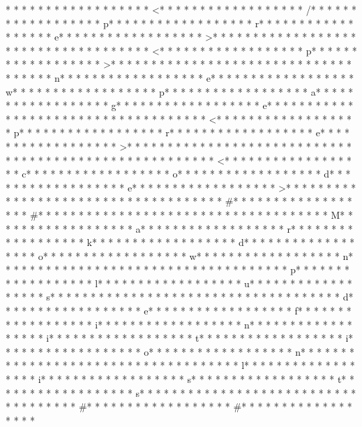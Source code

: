 * * *  * * *  * * *  *  * * *  *  * * *  * <* * *  * * *  * * *  *  * * *  *  * * *  * /* * *  * * *  * * *  *  * * *  *  * * *  * p* * *  * * *  * * *  *  * * *  *  * * *  * r* * *  * * *  * * *  *  * * *  *  * * *  * e* * *  * * *  * * *  *  * * *  *  * * *  * >* * *  * * *  * * *  *  * * *  *  * * *  * 
* * *  * * *  * * *  *  * * *  *  * * *  * <* * *  * * *  * * *  *  * * *  *  * * *  * p* * *  * * *  * * *  *  * * *  *  * * *  * >* * *  * * *  * * *  *  * * *  *  * * *  * 
* * *  * * *  * * *  *  * * *  *  * * *  * n* * *  * * *  * * *  *  * * *  *  * * *  * e* * *  * * *  * * *  *  * * *  *  * * *  * w* * *  * * *  * * *  *  * * *  *  * * *  * p* * *  * * *  * * *  *  * * *  *  * * *  * a* * *  * * *  * * *  *  * * *  *  * * *  * g* * *  * * *  * * *  *  * * *  *  * * *  * e* * *  * * *  * * *  *  * * *  *  * * *  * 
* * *  * * *  * * *  *  * * *  *  * * *  * <* * *  * * *  * * *  *  * * *  *  * * *  * p* * *  * * *  * * *  *  * * *  *  * * *  * r* * *  * * *  * * *  *  * * *  *  * * *  * e* * *  * * *  * * *  *  * * *  *  * * *  * >* * *  * * *  * * *  *  * * *  *  * * *  * 
* * *  * * *  * * *  *  * * *  *  * * *  * 	* * *  * * *  * * *  *  * * *  *  * * *  * <* * *  * * *  * * *  *  * * *  *  * * *  * c* * *  * * *  * * *  *  * * *  *  * * *  * o* * *  * * *  * * *  *  * * *  *  * * *  * d* * *  * * *  * * *  *  * * *  *  * * *  * e* * *  * * *  * * *  *  * * *  *  * * *  * >* * *  * * *  * * *  *  * * *  *  * * *  * 
* * *  * * *  * * *  *  * * *  *  * * *  * #* * *  * * *  * * *  *  * * *  *  * * *  * #* * *  * * *  * * *  *  * * *  *  * * *  *  * * *  * * *  * * *  *  * * *  *  * * *  * M* * *  * * *  * * *  *  * * *  *  * * *  * a* * *  * * *  * * *  *  * * *  *  * * *  * r* * *  * * *  * * *  *  * * *  *  * * *  * k* * *  * * *  * * *  *  * * *  *  * * *  * d* * *  * * *  * * *  *  * * *  *  * * *  * o* * *  * * *  * * *  *  * * *  *  * * *  * w* * *  * * *  * * *  *  * * *  *  * * *  * n* * *  * * *  * * *  *  * * *  *  * * *  *  * * *  * * *  * * *  *  * * *  *  * * *  * p* * *  * * *  * * *  *  * * *  *  * * *  * l* * *  * * *  * * *  *  * * *  *  * * *  * u* * *  * * *  * * *  *  * * *  *  * * *  * s* * *  * * *  * * *  *  * * *  *  * * *  *  * * *  * * *  * * *  *  * * *  *  * * *  * d* * *  * * *  * * *  *  * * *  *  * * *  * e* * *  * * *  * * *  *  * * *  *  * * *  * f* * *  * * *  * * *  *  * * *  *  * * *  * i* * *  * * *  * * *  *  * * *  *  * * *  * n* * *  * * *  * * *  *  * * *  *  * * *  * i* * *  * * *  * * *  *  * * *  *  * * *  * t* * *  * * *  * * *  *  * * *  *  * * *  * i* * *  * * *  * * *  *  * * *  *  * * *  * o* * *  * * *  * * *  *  * * *  *  * * *  * n* * *  * * *  * * *  *  * * *  *  * * *  *  * * *  * * *  * * *  *  * * *  *  * * *  * l* * *  * * *  * * *  *  * * *  *  * * *  * i* * *  * * *  * * *  *  * * *  *  * * *  * s* * *  * * *  * * *  *  * * *  *  * * *  * t* * *  * * *  * * *  *  * * *  *  * * *  * s* * *  * * *  * * *  *  * * *  *  * * *  *  * * *  * * *  * * *  *  * * *  *  * * *  * #* * *  * * *  * * *  *  * * *  *  * * *  * #* * *  * * *  * * *  *  * * *  *  * * *  * 
